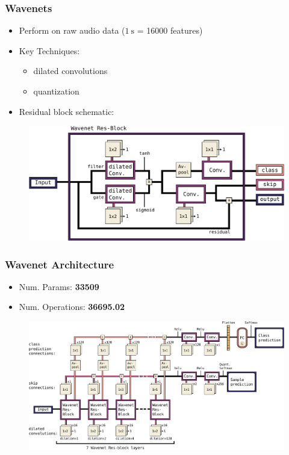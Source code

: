 \begin{frame}
  \frametitle{Wavenets}
  \begin{itemize}
    \item Perform  on raw audio data ($\SI{1}{\second}$ = 16000 features)
    \item Key Techniques: 
    \begin{itemize}
      \item dilated convolutions
      \item quantization
    \end{itemize}
    \item Residual block schematic:
  \end{itemize}
  \vspace{-0.2cm}
  \begin{figure} \includegraphics[height=0.35\textheight]{../4_nn/figs/nn_arch_wavenet_block.pdf} \end{figure}
\end{frame}

\begin{frame}
  \frametitle{Wavenet Architecture}
  \begin{itemize}
    \item Num. Params: \textbf{\num{33509}}
    \item Num. Operations: \textbf{\SI{36695.02}{\kilo\ops}}
  \end{itemize}
  \vspace{-0.2cm}
  \begin{figure} \includegraphics[height=0.6\textheight]{../4_nn/figs/nn_arch_wavenet_all.pdf} \end{figure}
\end{frame}